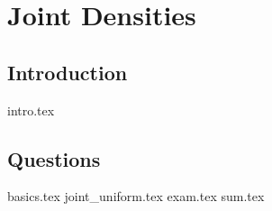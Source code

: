 \documentclass{exam}
\begin{document}
\section{Joint Densities}
\subsection{Introduction}
	{intro.tex}
\subsection{Questions}
\begin{questions}
	{basics.tex}
	{joint_uniform.tex}
	{exam.tex}
	{sum.tex}
\end{questions}
\end{document}
